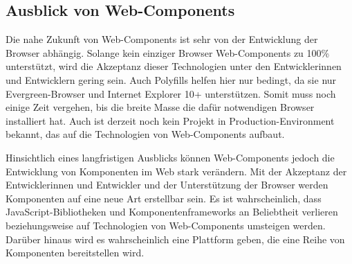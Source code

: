 \subsection{Ausblick von Web-Components}
\label{sec:7_Ausblick}

Die nahe Zukunft von Web-Components ist sehr von der Entwicklung der Browser abhängig. Solange kein einziger Browser Web-Components zu 100\% unterstützt, wird die Akzeptanz dieser Technologien unter den Entwicklerinnen und Entwicklern gering sein. Auch Polyfills helfen hier nur bedingt, da sie nur \glqq Evergreen\grqq -Browser und Internet Explorer 10+ unterstützen. Somit muss noch einige Zeit vergehen, bis die breite Masse die dafür notwendigen Browser installiert hat. Auch ist derzeit noch kein Projekt in Production-Environment bekannt, das auf die Technologien von Web-Components aufbaut.

Hinsichtlich eines langfristigen Ausblicks können Web-Components jedoch die Entwicklung von Komponenten im Web stark verändern. Mit der Akzeptanz der Entwicklerinnen und Entwickler und der Unterstützung der Browser werden Komponenten auf eine neue Art erstellbar sein. Es ist wahrscheinlich, dass JavaScript-Bibliotheken und Komponentenframeworks an Beliebtheit verlieren beziehungsweise auf Technologien von Web-Components umsteigen werden. Darüber hinaus wird es wahrscheinlich eine Plattform geben, die eine Reihe von Komponenten bereitstellen wird.